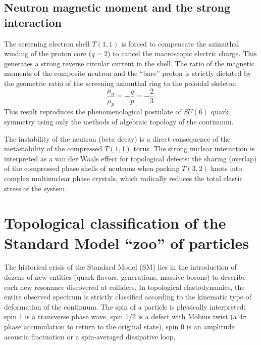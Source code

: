 \documentclass[11pt,a4paper]{article}
\begin{document}
\subsection{Neutron magnetic moment and the strong interaction}
The screening electron shell $T(1,1)$ is forced to compensate the azimuthal winding of the proton core ($q=2$) to cancel the macroscopic electric charge. This generates a strong reverse circular current in the shell. The ratio of the magnetic moments of the composite neutron and the ``bare'' proton is strictly dictated by the geometric ratio of the screening azimuthal ring to the poloidal skeleton:
\begin{equation}
\frac{\mu_n}{\mu_p} = -\frac{q}{p} = -\frac{2}{3}.
\end{equation}
This result reproduces the phenomenological postulate of $SU(6)$ quark symmetry using only the methods of algebraic topology of the continuum.

The instability of the neutron (beta decay) is a direct consequence of the metastability of the compressed $T(1,1)$ torus. The strong nuclear interaction is interpreted as a van der Waals effect for topological defects: the sharing (overlap) of the compressed phase shells of neutrons when packing $T(3,2)$ knots into complex multinuclear phase crystals, which radically reduces the total elastic stress of the system.

\section{Topological classification of the Standard Model ``zoo'' of particles}

The historical crisis of the Standard Model (SM) lies in the introduction of dozens of new entities (quark flavors, generations, massive bosons) to describe each new resonance discovered at colliders. In topological elastodynamics, the entire observed spectrum is strictly classified according to the kinematic type of deformation of the continuum. The spin of a particle is physically interpreted: spin 1 is a transverse phase wave, spin 1/2 is a defect with Möbius twist (a $4\pi$ phase accumulation to return to the original state), spin 0 is an amplitude acoustic fluctuation or a spin-averaged dissipative loop.
\end{document}
